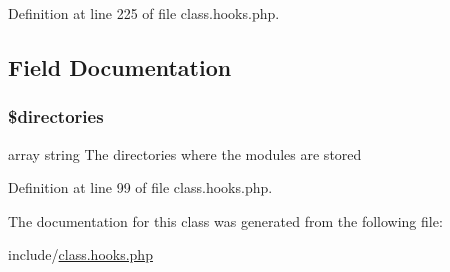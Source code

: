 Definition at line 225 of file class.\-hooks.\-php.



\subsection{Field Documentation}
\hypertarget{class_hook_aca1cfea95d9874525c94ddc586b87633}{
\subsubsection[{\$directories}]{\setlength{\rightskip}{0pt plus 5cm}\$directories\hspace{0.3cm}{\ttfamily [static]}}}\label{class_hook_aca1cfea95d9874525c94ddc586b87633}
array string The directories where the modules are stored 

Definition at line 99 of file class.\-hooks.\-php.



The documentation for this class was generated from the following file\-:\begin{DoxyCompactItemize}
\item 
include/\hyperlink{class_8hooks_8php}{class.\-hooks.\-php}\end{DoxyCompactItemize}
